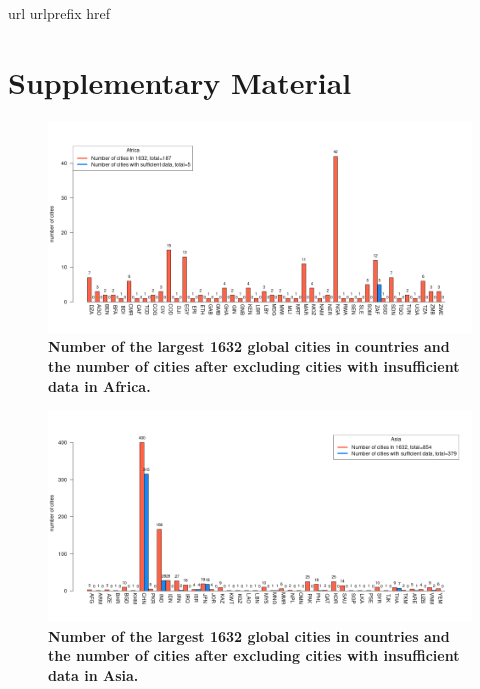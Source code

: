 \documentclass[preprint,10pt]{elsarticle} %
\newcommand{\beginsupplement}{%
        \setcounter{table}{0}
        \renewcommand{\thetable}{S\arabic{table}}%
        \setcounter{figure}{0}
        \renewcommand{\thefigure}{S\arabic{figure}}%
     }
\begin{document}






 
%
\begin{thebibliography}{1}
\expandafter\ifx\csname url\endcsname\relax
  \def\url#1{\texttt{#1}}\fi
\expandafter\ifx\csname urlprefix\endcsname\relax\def\urlprefix{URL }\fi
\expandafter\ifx\csname href\endcsname\relax
  \def\href#1#2{#2} \def\path#1{#1}\fi

\end{thebibliography}


\section{Supplementary Material}
\beginsupplement

\begin{figure}
\centering
\includegraphics[trim={ 0 35 25 50 },clip,scale=0.45]{Images/Africa_cities.png}
\caption{\bf Number of the largest 1632 global cities in countries and the number of cities after excluding cities with insufficient data in Africa.}
 \label{fig:africa}
\end{figure}

\begin{figure}
\centering
\includegraphics[trim={ 0 35 25 50 },clip,scale=0.45]{Images/Asia_cities.png}
\caption{\bf Number of the largest 1632 global cities in countries and the number of cities after excluding cities with insufficient data in Asia.}
 \label{fig:asia}
\end{figure}
\end{document}
